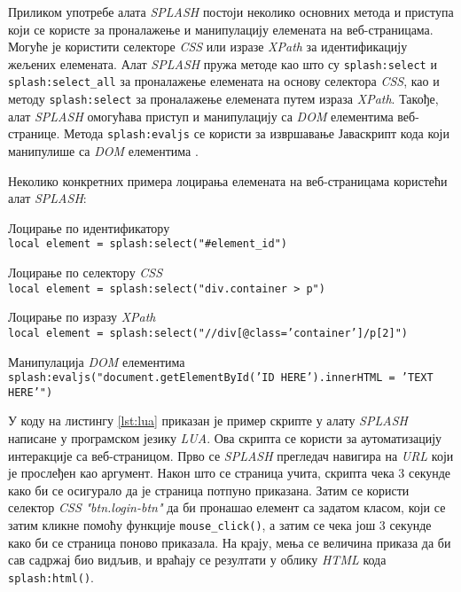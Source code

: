 \documentclass[12pt,oneside]{memoir}
\begin{document}
Приликом употребе алата \textit{SPLASH} постоји неколико основних метода и приступа који се користе за проналажење и манипулацију елемената на веб-страницама. Могуће је користити селекторе \textit{CSS} или изразе \textit{XPath} за идентификацију жељених елемената. Алат \textit{SPLASH} пружа методе као што су \texttt{splash:select} и \texttt{splash:select\_all} за проналажење елемената на основу селектора \textit{CSS}, као и методу \texttt{splash:select} за проналажење елемената путем израза  \textit{XPath}. Такође, алат \textit{SPLASH} омогућава приступ и манипулацију са \textit{DOM} елементима веб-странице. Метода \texttt{splash:evaljs} се користи за извршавање Јаваскрипт кода који манипулише са \textit{DOM} елементима \cite{splashDocs}.

Неколико конкретних примера лоцирања елемената на веб-страницама користећи алат \textit{SPLASH}:
\begin{description}
    \item Лоцирање по идентификатору\\
        \texttt{local element = splash:select("\#element\_id")}
    \item Лоцирање по селектору \textit{CSS}\\   
        \texttt{local element = splash:select("div.container > p")}
    \item Лоцирање по изразу \textit{XPath}\\ 
        \texttt{local element = splash:select("//div[@class='container']/p[2]")}
    \item Манипулација \textit{DOM} елементима\\
    \texttt{splash:evaljs("document.getElementById('ID HERE').innerHTML = 'TEXT HERE'")}
\end{description}

У коду на листингу \ref{lst:lua} приказан је пример скрипте у алату \textit{SPLASH} написане у програмском језику \textit{LUA}. Ова скрипта се користи за аутоматизацију интеракције са веб-страницом. Прво се \textit{SPLASH} прегледач навигира на \textit{URL} који је прослеђен као аргумент. Након што се страница учита, скрипта чека 3 секунде како би се осигурало да је страница потпуно приказана. Затим се користи селектор \textit{CSS} \textit{"btn.login-btn"} да би пронашао елемент са задатом класом, који се затим кликне помоћу функције \texttt{mouse\_click()}, а затим се чека још 3 секунде како би се страница поново приказала. На крају, мења се величина приказа да би сав садржај био видљив, и враћају се резултати у облику \textit{HTML} кода \texttt{splash:html()}.
\end{document}
